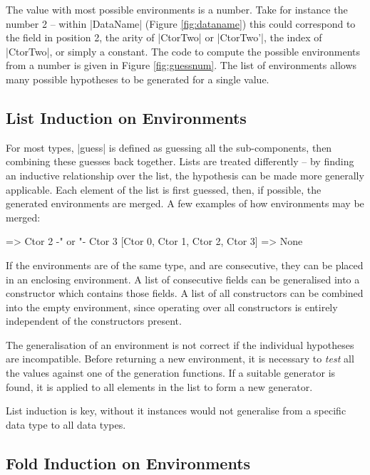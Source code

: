 \documentclass{llncs}
\begin{document}
The value with most possible environments is a number. Take for instance the number 2 -- within |DataName| (Figure \ref{fig:dataname}) this could correspond to the field in position 2, the arity of |CtorTwo| or |CtorTwo'|, the index of |CtorTwo|, or simply a constant. The code to compute the possible environments from a number is given in Figure \ref{fig:guessnum}. The list of environments allows many possible hypotheses to be generated for a single value.


\subsection{List Induction on Environments}
\label{sec:induction}

For most types, |guess| is defined as guessing all the sub-components, then combining these guesses back together. Lists are treated differently -- by finding an inductive relationship over the list, the hypothesis can be made more generally applicable. Each element of the list is first guessed, then, if possible, the generated environments are merged. A few examples of how environments may be merged:

\begin{code}
                => Ctor 2 {-" \;\; or \;\; "-} Ctor 3
[Ctor 0, Ctor 1, Ctor 2, Ctor 3]  => None
\end{code}

If the environments are of the same type, and are consecutive, they can be placed in an enclosing environment. A list of consecutive fields can be generalised into a constructor which contains those fields. A list of all constructors can be combined into the empty environment, since operating over all constructors is entirely independent of the constructors present.

The generalisation of an environment is not correct if the individual hypotheses are incompatible. Before returning a new environment, it is necessary to \textit{test} all the values against one of the generation functions. If a suitable generator is found, it is applied to all elements in the list to form a new generator.

List induction is key, without it instances would not generalise from a specific data type to all data types.

\subsection{Fold Induction on Environments}
\label{sec:folds}
\end{document}
